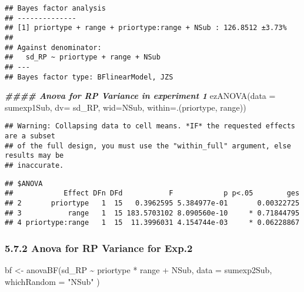 \documentclass[
]{article}
\newenvironment{Shaded}{\begin{snugshade}}{\end{snugshade}}
\newcommand{\AttributeTok}[1]{\textcolor[rgb]{0.77,0.63,0.00}{#1}}
\newcommand{\DocumentationTok}[1]{\textcolor[rgb]{0.56,0.35,0.01}{\textbf{\textit{#1}}}}
\newcommand{\FunctionTok}[1]{\textcolor[rgb]{0.00,0.00,0.00}{#1}}
\newcommand{\NormalTok}[1]{#1}
\newcommand{\OtherTok}[1]{\textcolor[rgb]{0.56,0.35,0.01}{#1}}
\newcommand{\SpecialCharTok}[1]{\textcolor[rgb]{0.00,0.00,0.00}{#1}}
\newcommand{\StringTok}[1]{\textcolor[rgb]{0.31,0.60,0.02}{#1}}
\begin{document}
\begin{verbatim}
## Bayes factor analysis
## --------------
## [1] priortype + range + priortype:range + NSub : 126.8512 ±3.73%
## 
## Against denominator:
##   sd_RP ~ priortype + range + NSub 
## ---
## Bayes factor type: BFlinearModel, JZS
\end{verbatim}

\begin{Shaded}
\begin{Highlighting}[]
\DocumentationTok{\#\#\#\# Anova for RP Variance in experiment 1}
 \FunctionTok{ezANOVA}\NormalTok{(}\AttributeTok{data =}\NormalTok{ sumexp1Sub, }\AttributeTok{dv=}\NormalTok{ sd\_RP, }\AttributeTok{wid=}\NormalTok{NSub, }\AttributeTok{within=}\NormalTok{.(priortype, range))}
\end{Highlighting}
\end{Shaded}

\begin{verbatim}
## Warning: Collapsing data to cell means. *IF* the requested effects are a subset
## of the full design, you must use the "within_full" argument, else results may be
## inaccurate.
\end{verbatim}

\begin{verbatim}
## $ANOVA
##            Effect DFn DFd           F            p p<.05        ges
## 2       priortype   1  15   0.3962595 5.384977e-01       0.00322725
## 3           range   1  15 183.5703102 8.090560e-10     * 0.71844795
## 4 priortype:range   1  15  11.3996031 4.154744e-03     * 0.06228867
\end{verbatim}

\hypertarget{anova-for-rp-variance-for-exp.2}{%
\subsubsection{5.7.2 Anova for RP Variance for
Exp.2}\label{anova-for-rp-variance-for-exp.2}}

\begin{Shaded}
\begin{Highlighting}[]
\NormalTok{bf }\OtherTok{\textless{}{-}} \FunctionTok{anovaBF}\NormalTok{(sd\_RP }\SpecialCharTok{\textasciitilde{}}\NormalTok{ priortype }\SpecialCharTok{*}\NormalTok{ range }\SpecialCharTok{+}\NormalTok{ NSub, }\AttributeTok{data =}\NormalTok{ sumexp2Sub, }\AttributeTok{whichRandom =} \StringTok{"NSub"}\NormalTok{ ) }
\end{Highlighting}
\end{Shaded}
\end{document}
